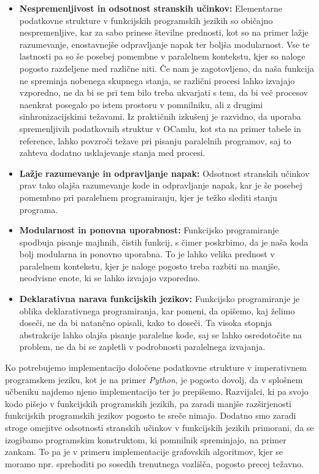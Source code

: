 \documentclass[fin1, tisk]{fmfdelo}
\begin{document}
\begin{itemize} \label{itemize:prednosti_funkcijskega_programiranja}
  \item \textbf{Nespremenljivost in odsotnost stranskih učinkov:} 
    Elementarne podatkovne strukture v funkcijskih programskih jezikih so običajno nespremenljive, kar za sabo prinese številne
    prednosti, kot so na primer lažje razumevanje, enostavnejše odpravljanje napak ter boljša modularnost.
    Vse te lastnosti pa so še posebej pomembne v paralelnem kontekstu, kjer so naloge pogosto razdeljene med
    različne niti. Če nam je zagotovljeno, da naša funkcija ne spreminja nobenega skupnega stanja, se
    različni procesi lahko izvajajo vzporedno, ne da bi se pri tem bilo treba ukvarjati s tem, da bi več procesov
    naenkrat posegalo po istem prostoru v pomnilniku, ali z drugimi sinhronizacijskimi težavami.
    Iz praktičnih izkušenj je razvidno, da uporaba spremenljivih podatkovnih struktur v OCamlu, kot sta na primer
    tabele in reference, lahko povzroči težave pri pisanju paralelnih programov, saj to zahteva
    dodatno usklajevanje stanja med procesi.

  \item \textbf{Lažje razumevanje in odpravljanje napak:} 
    Odsotnost stranskih učinkov prav tako olajša razumevanje kode in odpravljanje napak, kar je še posebej
    pomembno pri paralelnem programiranju, kjer je težko slediti stanju programa.

  \item \textbf{Modularnost in ponovna uporabnost:}
    Funkcijsko programiranje spodbuja pisanje majhnih, čistih funkcij, s čimer poskrbimo, da je naša koda bolj 
    modularna in ponovno uporabna. To je lahko velika prednost v paralelnem kontekstu,
    kjer je naloge pogosto treba razbiti na manjše, neodvisne enote, ki se lahko izvajajo vzporedno.

  \item \textbf{Deklarativna narava funkcijskih jezikov:} 
    Funkcijsko programiranje je oblika deklarativnega programiranja, kar pomeni, da opišemo, kaj želimo doseči, 
    ne da bi natančno opisali, kako to doseči. Ta visoka stopnja abstrakcije lahko olajša pisanje paralelne kode, 
    saj se lahko osredotočite na problem, ne da bi se zapletli v podrobnosti paralelnega izvajanja.
\end{itemize}

Ko potrebujemo implementacijo določene podatkovne strukture v imperativnem programskem jeziku, kot je na primer
\textit{Python}, je pogosto dovolj, da v splošnem učbeniku najdemo njeno implementacijo ter jo prepišemo.
Razvijalci, ki pa svojo kodo pišejo v funkcijskih programskih jezikih, pa zaradi manjše
razširjenosti funkcijskih programskih jezikov pogosto te sreče nimajo.
Dodatno smo zaradi stroge omejitve odsotnosti stranskih učinkov v funkcijskih jezikih primorani, da se izogibamo
programskim konstruktom, ki pomnilnik spreminjajo, na primer zankam. To pa je v primeru implementacije grafovskih
algoritmov, kjer se moramo npr. sprehoditi po sosedih trenutnega vozlišča, pogosto precej težavno.
\end{document}
